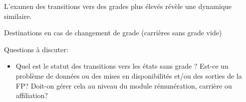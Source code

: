 \documentclass[11pt,a4paper]{article}
\begin{document}
L'examen des transitions vers des grades plus élevés révèle une dynamique similaire.
\begin{table}[htbp]
    \label{tab:purged_second_destination}
    \centering
    \caption{Destinations en cas de changement de grade (carrières sans grade vide)} 
    
\end{table}

Questions à discuter:
\begin{itemize}[leftmargin=1cm, parsep=0cm, itemsep=0cm, topsep=0cm] 
    \item Quel est le statut des transitions vers les états sans grade ? Est-ce un problème de données ou des mises en disponibilités et/ou des sorties de la FP? Doit-on gérer cela au niveau du module rémunération, carrière ou affiliation? 
\end{itemize}




\ifx\isEmbedded\undefined
\newpage
 

\end{document}
